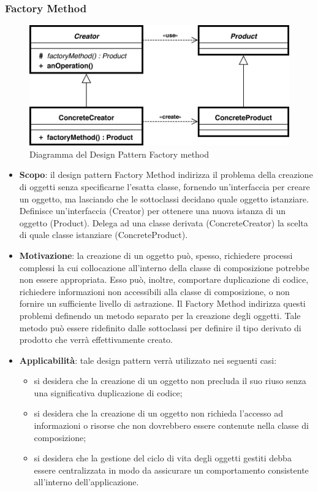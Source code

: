		\subsubsection{Factory Method}
		\begin{figure}[H]
		\centering
		\includegraphics[width=0.5\linewidth]{GraficiAppendici/factory.png}
		\caption{Diagramma del Design Pattern Factory method}
	\end{figure}
		\begin{itemize}
		\item \textbf{Scopo}: il design pattern Factory Method indirizza il problema della creazione
di oggetti senza specificarne l’esatta classe, fornendo un’interfaccia per creare un oggetto, ma lasciando che le sottoclassi decidano quale oggetto istanziare. Definisce un’interfaccia (Creator) per ottenere una nuova istanza di un oggetto (Product). Delega ad una classe derivata (ConcreteCreator) la scelta di quale classe istanziare (ConcreteProduct).
		\item \textbf{Motivazione}: la creazione di un oggetto può, spesso, richiedere processi complessi la cui collocazione all’interno della classe di composizione potrebbe non essere appropriata. Esso può, inoltre, comportare duplicazione di codice, richiedere informazioni non accessibili alla classe di composizione, o non fornire un sufficiente livello di astrazione.
Il Factory Method indirizza questi problemi definendo un metodo separato per la creazione degli oggetti. Tale metodo può essere ridefinito dalle sottoclassi per definire il tipo derivato di prodotto che verrà effettivamente creato.
		\item \textbf{Applicabilità}: tale design pattern verrà utilizzato nei seguenti casi:
		\begin{itemize}
		\item si desidera che la creazione di un oggetto non precluda il suo riuso senza una significativa duplicazione di codice;
		\item si desidera che la creazione di un oggetto non richieda l’accesso ad informazioni o risorse che non dovrebbero essere contenute nella classe di composizione;
		\item si desidera che la gestione del ciclo di vita degli oggetti gestiti debba essere centralizzata in modo da assicurare un comportamento consistente all’interno dell’applicazione.
		\end{itemize}
		\end{itemize}				
		
